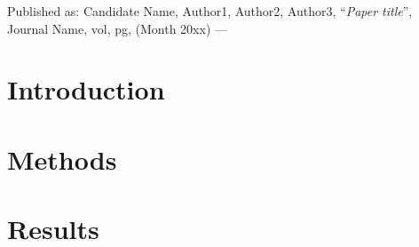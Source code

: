 {Published as: 
\textnormal{{\color{denimdarkblue} Candidate Name}, 
Author1, Author2, Author3, 
``\emph{Paper title}'',
Journal Name,} vol, 
\textnormal{pg, (Month 20xx) --- \cite{TestArticle-2022-ARAA}}
}
\label{chap:p2-surface-convection}

\section{Introduction} \label{sec:p2-intro}
\lipsum[1-6]

\section{Methods} \label{sec:p2-methods}
\lipsum[1-6]

\section{Results} \label{sec:p2-results}
\lipsum[1-6]

